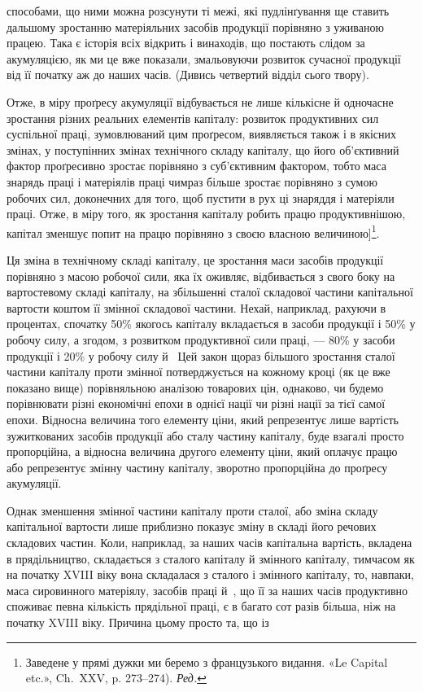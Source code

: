 \parcont{}  %
способами, що ними можна розсунути ті межі, які пудлінґування
ще ставить дальшому зростанню матеріяльних засобів продукції
порівняно з уживаною працею. Така є історія всіх відкрить
і винаходів, що постають слідом за акумуляцією, як ми це
вже показали, змальовуючи розвиток сучасної продукції від її
початку аж до наших часів. (Дивись четвертий відділ сього
твору).

\disablefootnotebreak{}
Отже, в міру проґресу акумуляції відбувається не лише
кількісне й одночасне зростання різних реальних елементів
капіталу: розвиток продуктивних сил суспільної праці, зумовлюваний
цим проґресом, виявляється також і в якісних змінах,
у поступінних змінах технічного складу капіталу, що його об’єктивний
фактор проґресивно зростає порівняно з суб’єктивним
фактором, тобто маса знарядь праці і матеріялів праці чимраз
більше зростає порівняно з сумою робочих сил, доконечних для
того, щоб пустити в рух ці знаряддя і матеріяли праці. Отже,
в міру того, як зростання капіталу робить працю продуктивнішою,
капітал зменшує попит на працю порівняно з своєю власною
величиною]\footnote*{
Заведене у прямі дужки ми беремо з французького видання.
«Le Capital etc.», Ch.~XXV, p. 273--274). \emph{Ред.}
}.
\enablefootnotebreak{}

Ця зміна в технічному складі капіталу, це зростання маси
засобів продукції порівняно з масою робочої сили, яка їх оживляє,
відбивається з свого боку на вартостевому складі капіталу, на
збільшенні сталої складової частини капітальної вартости коштом
її змінної складової частини. Нехай, наприклад, рахуючи
в процентах, спочатку 50\% якогось капіталу вкладається в засоби
продукції і 50\% у робочу силу, а згодом, з розвитком продуктивної
сили праці, — 80\% у засоби продукції і 20\% у робочу силу
й~ Цей закон щораз більшого зростання сталої частини капіталу
проти змінної потверджується на кожному кроці (як це вже
показано вище) порівняльною аналізою товарових цін, однаково,
чи будемо порівнювати різні економічні епохи в однієї нації
чи різні нації за тієї самої епохи. Відносна величина того елементу
ціни, який репрезентує лише вартість зужиткованих засобів
продукції або сталу частину капіталу, буде взагалі просто
пропорційна, а відносна величина другого елементу ціни, який
оплачує працю або репрезентує змінну частину капіталу, зворотно
пропорційна до проґресу акумуляції.

Однак зменшення змінної частини капіталу проти сталої,
або зміна складу капітальної вартости лише приблизно показує
зміну в складі його речових складових частин. Коли, наприклад,
за наших часів капітальна вартість, вкладена в прядільництво,
складається з  сталого капіталу й  змінного капіталу,
тимчасом як на початку XVIII віку вона складалася з  сталого
і  змінного капіталу, то, навпаки, маса сировинного матеріялу,
засобів праці й~, що її за наших часів продуктивно споживає
певна кількість прядільної праці, є в багато сот разів більша,
ніж на початку XVIII віку. Причина цьому просто та, що із
\parbreak{}  %
